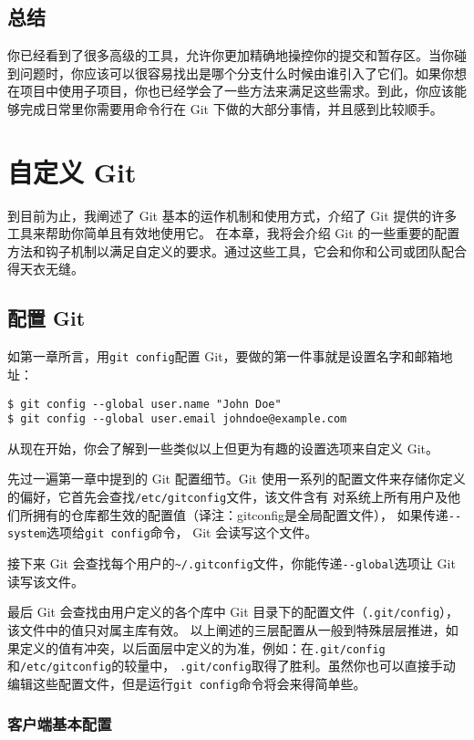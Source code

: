 \documentclass[a4paper]{book}
\newcommand{\chap}[1]{\newpage\thispagestyle{empty}\chapter{#1}\label{chap:\thechapter}}
\begin{document}
\section{总结}

你已经看到了很多高级的工具，允许你更加精确地操控你的提交和暂存区。当你碰到问题时，你应该可以很容易找出是哪个分支什么时候由谁引入了它们。如果你想在项目中使用子项目，你也已经学会了一些方法来满足这些需求。到此，你应该能够完成日常里你需要用命令行在 Git 下做的大部分事情，并且感到比较顺手。

\chap{自定义 Git}

到目前为止，我阐述了 Git 基本的运作机制和使用方式，介绍了 Git 提供的许多工具来帮助你简单且有效地使用它。 在本章，我将会介绍 Git 的一些重要的配置方法和钩子机制以满足自定义的要求。通过这些工具，它会和你和公司或团队配合得天衣无缝。

\section{配置 Git}

如第一章所言，用\texttt{git config}配置 Git，要做的第一件事就是设置名字和邮箱地址：

\begin{shaded}\begin{verbatim}
$ git config --global user.name "John Doe"
$ git config --global user.email johndoe@example.com
\end{verbatim}\end{shaded}

从现在开始，你会了解到一些类似以上但更为有趣的设置选项来自定义 Git。

先过一遍第一章中提到的 Git 配置细节。Git 使用一系列的配置文件来存储你定义的偏好，它首先会查找\texttt{/etc/gitconfig}文件，该文件含有 对系统上所有用户及他们所拥有的仓库都生效的配置值（译注：gitconfig是全局配置文件）， 如果传递\texttt{-{}-system}选项给\texttt{git config}命令， Git 会读写这个文件。

接下来 Git 会查找每个用户的\texttt{\textasciitilde{}/.gitconfig}文件，你能传递\texttt{-{}-global}选项让 Git读写该文件。

最后 Git 会查找由用户定义的各个库中 Git 目录下的配置文件（\texttt{.git/config}），该文件中的值只对属主库有效。 以上阐述的三层配置从一般到特殊层层推进，如果定义的值有冲突，以后面层中定义的为准，例如：在\texttt{.git/config}和\texttt{/etc/gitconfig}的较量中， \texttt{.git/config}取得了胜利。虽然你也可以直接手动编辑这些配置文件，但是运行\texttt{git config}命令将会来得简单些。

\subsection{客户端基本配置}
\end{document}
